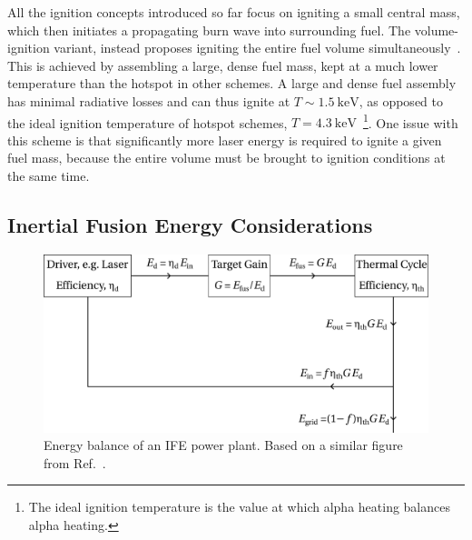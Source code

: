 All the ignition concepts introduced so far focus on igniting a small central mass, which then initiates a propagating burn wave into surrounding fuel.
The volume-ignition variant, instead proposes igniting the entire fuel volume simultaneously~\cite{khoda-bakhsh_advanced_1992,molvig_low_2016}.
This is achieved by assembling a large, dense fuel mass, kept at a much lower temperature than the hotspot in other schemes.
A large and dense fuel assembly has minimal radiative losses and can thus ignite at $T\sim1.5\ \text{keV}$, as opposed to the ideal ignition temperature of hotspot schemes, $T=4.3\ \text{keV}$~\cite{atzeni_physics_2004}\footnote{The ideal ignition temperature is the value at which alpha heating balances alpha heating.}.
One issue with this scheme is that significantly more laser energy is required to ignite a given fuel mass, because the entire volume must be brought to ignition conditions at the same time.

\subsection{Inertial Fusion Energy Considerations}%
\label{sec:intro_IFE_gain}

\begin{figure}[t!]
    \includegraphics[width=0.8\linewidth]{Introduction/Images/IFE_powerplant.png}
    \centering
    \caption{Energy balance of an \ac{IFE} power plant.
    Based on a similar figure from Ref.~\cite{atzeni_physics_2004}.
    }%
    \label{fig:intro_IFE_energy_balance}
\end{figure}

